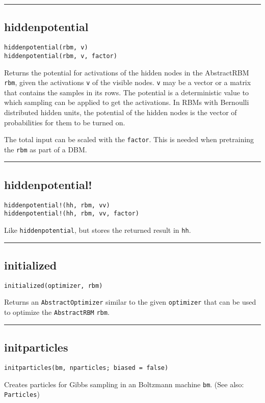 \noindent\rule{\textwidth}{1pt}
\subsection*{hiddenpotential}
\begin{verbatim}
hiddenpotential(rbm, v)
hiddenpotential(rbm, v, factor)
\end{verbatim}
Returns the potential for activations of the hidden nodes in the AbstractRBM \texttt{rbm}, given the activations \texttt{v} of the visible nodes. \texttt{v} may be a vector or a matrix that contains the samples in its rows. The potential is a deterministic value to which sampling can be applied to get the activations. In RBMs with Bernoulli distributed hidden units, the potential of the hidden nodes is the vector of probabilities for them to be turned on.

The total input can be scaled with the \texttt{factor}. This is needed when pretraining the \texttt{rbm} as part of a DBM.

\noindent\rule{\textwidth}{1pt}
\subsection*{hiddenpotential!}
\begin{verbatim}
hiddenpotential!(hh, rbm, vv)
hiddenpotential!(hh, rbm, vv, factor)
\end{verbatim}
Like \texttt{hiddenpotential}, but stores the returned result in \texttt{hh}.

\noindent\rule{\textwidth}{1pt}
\subsection*{initialized}
\begin{verbatim}
initialized(optimizer, rbm)
\end{verbatim}
Returns an \texttt{AbstractOptimizer} similar to the given \texttt{optimizer} that can be used to optimize the \texttt{AbstractRBM} \texttt{rbm}.

\noindent\rule{\textwidth}{1pt}
\subsection*{initparticles}
\begin{verbatim}
initparticles(bm, nparticles; biased = false)
\end{verbatim}
Creates particles for Gibbs sampling in an Boltzmann machine \texttt{bm}. (See also: \texttt{Particles})

